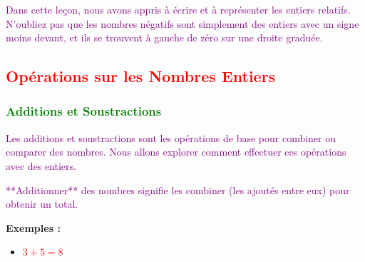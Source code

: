 \documentclass{article}
\begin{document}
\vspace{0.5cm}

\begin{tcolorbox}[colback=yellow!10!white, colframe=cyan!80!black, title=\textcolor{black}{Récapitulatif}, sharp corners=southwest]
\textcolor{purple}{Dans cette leçon, nous avons appris à écrire et à représenter les entiers relatifs. N'oubliez pas que les nombres négatifs sont simplement des entiers avec un signe moins devant, et ils se trouvent à gauche de zéro sur une droite graduée.}
\end{tcolorbox}

\subsection{\textcolor{red}{Opérations sur les Nombres Entiers}}

\subsubsection{\textcolor{green}{Additions et Soustractions}}

\vspace{0.5cm}

\begin{tcolorbox}[colback=cyan!10!white, colframe=red!75!black, title=\textcolor{white}{Définition}, 
                  sharp corners=southwest]
                  
\textcolor{purple}{Les additions et soustractions sont les opérations de base pour combiner ou comparer des nombres. Nous allons explorer comment effectuer ces opérations avec des entiers.}
\end{tcolorbox}

\vspace{0.5cm}

\textcolor{purple}{**Additionner** des nombres signifie les combiner (les ajoutés entre eux) pour obtenir un total.}

\vspace{0.15cm}

\textbf{Exemples :}

\begin{itemize}
    \item \textcolor{red}{\(3 + 5 = 8\)}
\end{itemize}
\end{document}
